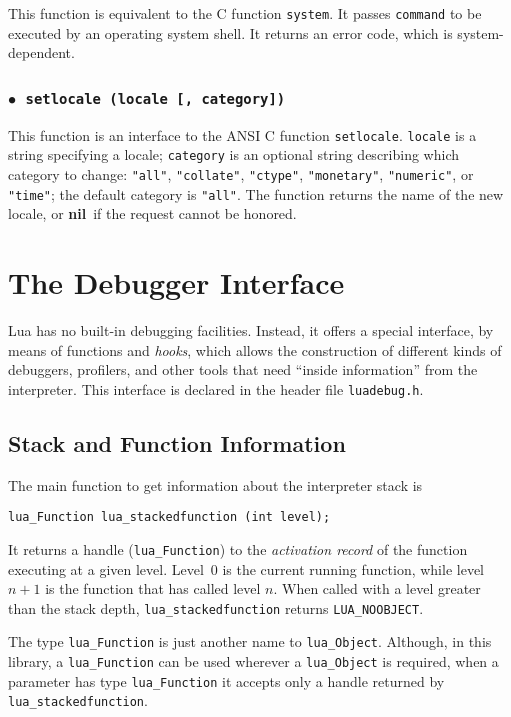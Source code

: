 \documentclass[11pt]{article}
\newcommand{\T}[1]{{\tt #1}}
\newcommand{\Math}[1]{$#1$}
\newcommand{\nil}{{\bf nil}}
\newcommand{\Deffunc}[1]{\index{#1}}
\newcommand{\ff}{$\bullet$\ }
\begin{document}
This function is equivalent to the C function \verb|system|.
It passes \verb|command| to be executed by an operating system shell.
It returns an error code, which is system-dependent.

\subsubsection*{\ff \T{setlocale (locale [, category])}}\Deffunc{setlocale}

This function is an interface to the ANSI C function \verb|setlocale|.
\verb|locale| is a string specifying a locale;
\verb|category| is an optional string describing which category to change:
\verb|"all"|, \verb|"collate"|, \verb|"ctype"|,
\verb|"monetary"|, \verb|"numeric"|, or \verb|"time"|;
the default category is \verb|"all"|.
The function returns the name of the new locale,
or \nil\ if the request cannot be honored.


\section{The Debugger Interface} \label{debugI}

Lua has no built-in debugging facilities.
Instead, it offers a special interface,
by means of functions and \emph{hooks},
which allows the construction of different
kinds of debuggers, profilers, and other tools
that need ``inside information'' from the interpreter.
This interface is declared in the header file \verb|luadebug.h|.

\subsection{Stack and Function Information}

The main function to get information about the interpreter stack
is
\begin{verbatim}
lua_Function lua_stackedfunction (int level);
\end{verbatim}
It returns a handle (\verb|lua_Function|) to the \emph{activation record}
of the function executing at a given level.
Level~0 is the current running function,
while level \Math{n+1} is the function that has called level \Math{n}.
When called with a level greater than the stack depth,
\verb|lua_stackedfunction| returns \verb|LUA_NOOBJECT|.

The type \verb|lua_Function| is just another name
to \verb|lua_Object|.
Although, in this library,
a \verb|lua_Function| can be used wherever a \verb|lua_Object| is required,
when a parameter has type \verb|lua_Function|
it accepts only a handle returned by
\verb|lua_stackedfunction|.
\end{document}
